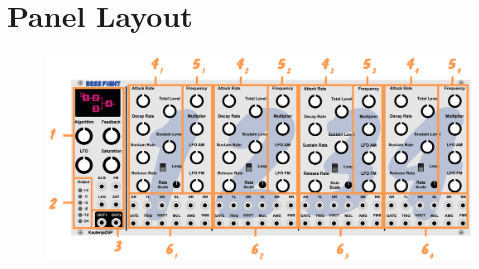 \documentclass[12pt,letter]{article}
\begin{document}

\clearpage
\section*{Panel Layout}

\begin{figure}[!htp]
\centering
\includegraphics[width=\maxwidth{\textwidth}]{Interface}
\end{figure}
\end{document}
